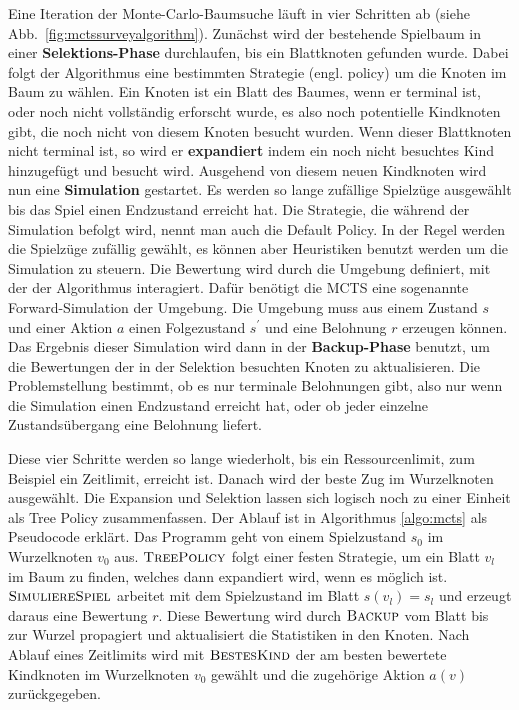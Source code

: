 Eine Iteration der Monte-Carlo-Baumsuche läuft in vier Schritten ab (siehe Abb.~\ref{fig:mctssurveyalgorithm}).
Zunächst wird der bestehende Spielbaum in einer \textbf{Selektions-Phase} durchlaufen, bis ein Blattknoten gefunden wurde.
Dabei folgt der Algorithmus eine bestimmten Strategie (engl. policy) um die Knoten im Baum zu wählen.
Ein Knoten ist ein Blatt des Baumes, wenn er terminal ist, oder noch nicht vollständig erforscht wurde, es also noch potentielle Kindknoten gibt, die noch nicht von diesem Knoten besucht wurden.
Wenn dieser Blattknoten nicht terminal ist, so wird er \textbf{expandiert} indem ein noch nicht besuchtes Kind hinzugefügt und besucht wird.
Ausgehend von diesem neuen Kindknoten wird nun eine \textbf{Simulation} gestartet.
Es werden so lange zufällige Spielzüge ausgewählt bis das Spiel einen Endzustand erreicht hat.
Die Strategie, die während der Simulation befolgt wird, nennt man auch die Default Policy.
In der Regel werden die Spielzüge zufällig gewählt, es können aber Heuristiken benutzt werden um die Simulation zu steuern.
Die Bewertung wird durch die Umgebung definiert, mit der der Algorithmus interagiert.
Dafür benötigt die MCTS eine sogenannte Forward-Simulation der Umgebung. Die Umgebung muss aus einem Zustand $s$ und einer Aktion $a$ einen Folgezustand $s^\prime$ und eine Belohnung $r$ erzeugen können. Das Ergebnis dieser Simulation wird dann in der \textbf{Backup-Phase} benutzt, um die Bewertungen der in der Selektion besuchten Knoten zu aktualisieren. Die Problemstellung bestimmt, ob es nur terminale Belohnungen gibt, also nur wenn die Simulation einen Endzustand erreicht hat, oder ob jeder einzelne Zustandsübergang eine Belohnung liefert.

Diese vier Schritte werden so lange wiederholt, bis ein Ressourcenlimit, zum Beispiel ein Zeitlimit, erreicht ist. Danach wird der beste Zug im Wurzelknoten ausgewählt. Die Expansion und Selektion lassen sich logisch noch zu einer Einheit als Tree Policy zusammenfassen.
Der Ablauf ist in Algorithmus \ref{algo:mcts} als Pseudocode erklärt. Das Programm geht von einem Spielzustand $s_0$ im Wurzelknoten $v_0$ aus. $\textsc{TreePolicy}$ folgt einer festen Strategie, um ein Blatt $v_l$ im Baum zu finden, welches dann expandiert wird, wenn es möglich ist. $\textsc{SimuliereSpiel}$ arbeitet mit dem Spielzustand im Blatt $s(v_l) = s_l$ und erzeugt daraus eine Bewertung $r$. Diese Bewertung wird durch $\textsc{Backup}$ vom Blatt bis zur Wurzel propagiert und aktualisiert die Statistiken in den Knoten. Nach Ablauf eines Zeitlimits wird mit $\textsc{BestesKind}$ der am besten bewertete Kindknoten im Wurzelknoten $v_0$ gewählt und die zugehörige Aktion $a(v)$ zurückgegeben.

